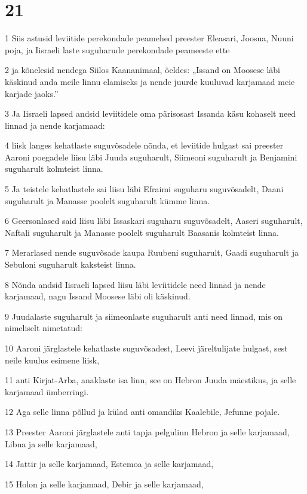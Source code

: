 \chapter{21}

\par 1 Siis astusid leviitide perekondade peamehed preester Eleasari, Joosua, Nuuni poja, ja Iisraeli laste suguharude perekondade peameeste ette
\par 2 ja kõnelesid nendega Siilos Kaananimaal, öeldes: „Issand on Moosese läbi käskinud anda meile linnu elamiseks ja nende juurde kuuluvad karjamaad meie karjade jaoks.”
\par 3 Ja Iisraeli lapsed andsid leviitidele oma pärisosast Issanda käsu kohaselt need linnad ja nende karjamaad:
\par 4 liisk langes kehatlaste suguvõsadele nõnda, et leviitide hulgast sai preester Aaroni poegadele liisu läbi Juuda suguharult, Siimeoni suguharult ja Benjamini suguharult kolmteist linna.
\par 5 Ja teistele kehatlastele sai liisu läbi Efraimi suguharu suguvõsadelt, Daani suguharult ja Manasse poolelt suguharult kümme linna.
\par 6 Geersonlased said liisu läbi Issaskari suguharu suguvõsadelt, Aaseri suguharult, Naftali suguharult ja Manasse poolelt suguharult Baasanis kolmteist linna.
\par 7 Merarlased nende suguvõsade kaupa Ruubeni suguharult, Gaadi suguharult ja Sebuloni suguharult kaksteist linna.
\par 8 Nõnda andsid Iisraeli lapsed liisu läbi leviitidele need linnad ja nende karjamaad, nagu Issand Moosese läbi oli käskinud.
\par 9 Juudalaste suguharult ja siimeonlaste suguharult anti need linnad, mis on nimeliselt nimetatud:
\par 10 Aaroni järglastele kehatlaste suguvõsadest, Leevi järeltulijate hulgast, sest neile kuulus esimene liisk,
\par 11 anti Kirjat-Arba, anaklaste isa linn, see on Hebron Juuda mäestikus, ja selle karjamaad ümberringi.
\par 12 Aga selle linna põllud ja külad anti omandiks Kaalebile, Jefunne pojale.
\par 13 Preester Aaroni järglastele anti tapja pelgulinn Hebron ja selle karjamaad, Libna ja selle karjamaad,
\par 14 Jattir ja selle karjamaad, Estemoa ja selle karjamaad,
\par 15 Holon ja selle karjamaad, Debir ja selle karjamaad,
